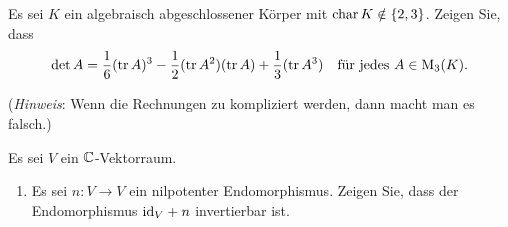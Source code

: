 \begin{question}[subtitle = Determinante durch Tracepowers ausdrücken]{3}
  Es sei $K$ ein algebraisch abgeschlossener Körper mit $\operatorname{char} K \notin \{2,3\}$.
  Zeigen Sie, dass
  \[
    \det A = \frac{1}{6} (\operatorname{tr} A)^3 - \frac{1}{2} (\operatorname{tr} A^2)(\operatorname{tr} A) + \frac{1}{3} (\operatorname{tr} A^3)
    \quad
    \text{für jedes $A \in \operatorname{M}_3(K)$}.
  \]
  
  (\emph{Hinweis}:
   Wenn die Rechnungen zu kompliziert werden, dann macht man es falsch.)
\end{question}








\begin{question}[subtitle = Die multiplikative Jordanzerlegung]{4}
  Es sei $V$ ein $\mathbb{C}$-Vektorraum.
  \begin{enumerate}[leftmargin=*]
    \item
      Es sei $n \colon V \to V$ ein nilpotenter Endomorphismus.
      Zeigen Sie, dass der Endomorphismus ${\operatorname{id}_V} + n$ invertierbar ist.
      

\end{enumerate}
\end{question}
